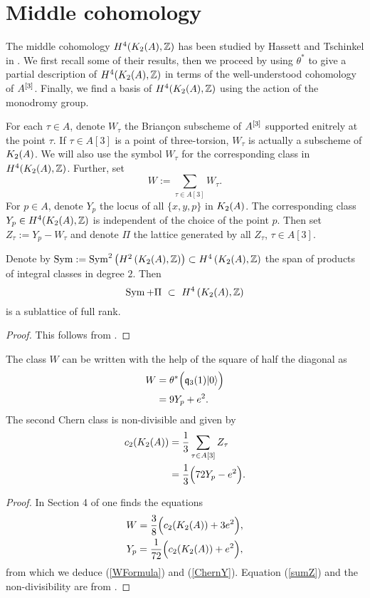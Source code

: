 
 \section{Middle cohomology}\label{Middle}
The middle cohomology $H^4(K_{ 2 }( A ),\mathbb{Z})$ has been studied by Hassett and Tschinkel in \cite{Hassett}. We first recall some of their results,
then we proceed by using $\theta^*$ to give a partial description of $H^4(K_{ 2 }( A ),\mathbb{Z})$ in terms of the well-understood cohomology of $A^{[3]}$. 
Finally, we find a basis of $H^4(K_{ 2 }( A ),\mathbb{Z})$ using the action of the monodromy group.
\begin{notation}
For each $\tau \in A$, denote $W_\tau$ the Brian\c con subscheme of $A^{[3]}$ supported enitrely at the point $\tau$. If $\tau\in A[3]$ is a point of three-torsion, $W_\tau$ is actually a subscheme of $K_{ 2 }( A )$. We will also use the symbol $W_\tau$ for the corresponding class in $H^4(K_{ 2 }( A ),\mathbb{Z})$. Further, set 
$$
W := \sum_{\tau\in A[3]} W_\tau.
$$
For $p\in A$, denote $Y_p$ the locus of all $\{x,y,p\}$ in $K_{ 2 }( A )$. The corresponding class $Y_p \in H^4(K_{ 2 }( A ),\mathbb{Z})$ is independent of the choice of the point $p$. Then set $Z_\tau := Y_p - W_\tau$ and denote $\Pi$ the lattice generated by all $Z_\tau$, $\tau \in A[3]$.
\end{notation}
\begin{proposition}
Denote by $\operatorname{Sym} := \operatorname{Sym}^2\left(H^2\left(K_{ 2 }( A ),\mathbb{Z}\right)\right) \subset H^4\left(K_{ 2 }( A ),\mathbb{Z}\right) $ the span of products of integral classes in degree $2$.
Then 
$$
\Sym+\Pi \ \subset\  H^4\left(\X,\Z\right)
$$
is a sublattice  of full rank.  
\end{proposition}
\begin{proof}
This follows from \cite[Proposition 4.3]{Hassett}.
\end{proof}

\begin{proposition}
The class $W$ can be written with the help of the square of half the diagonal as
\begin{align} 
W &= \theta^*\Big( \mathfrak{q}_3(1)|0\rangle \Big) \\
\label{WFormula}
&= 9 Y_p + e^2.
\end{align}
The second Chern class is non-divisible and given by 
\begin{align}
\label{sumZ}
c_2(K_{ 2 }( A )) &= \frac{1}{3}\sum_{\tau\in A[3] } Z_\tau \\
\label{ChernY}
&= \frac{1}{3} \Big(72Y_p-e^2 \Big). 
\end{align}
\end{proposition}
\begin{proof} 
In Section 4 of \cite{Hassett} one finds the equations
\begin{gather}
W = \frac{3}{8}\Big(c_2(K_{ 2 }( A )) + 3e^2\Big),\label{WW} \\
Y_p = \frac{1}{72}\Big(c_2(K_{ 2 }( A )) + e^2\Big),
\end{gather}
from which we deduce (\ref{WFormula}) and (\ref{ChernY}).
Equation (\ref{sumZ}) and the non-divisibility are from \cite[Proposition 5.1]{Hassett}.
\end{proof}


